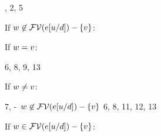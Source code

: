 \begin{bycase}
\Case{$\absO$}
\begin{derivation}
\step{\varI\in\efvar{\absO}}{\hyp}
\step{\esbsokO{\absO}}{\hyp}
\step{\efvar{\esbsO{\expr}}=(\efvar{\expr}-\setI{\varI})\cup\efvar{\exprI}}
     {, 2, 5}
\end{derivation}
If $w\not\in\mathcal{FV}(e[u/d])-\{v\}$:
\begin{derivatioN}{7}
\steP{\cvarv{\abs{\var}{\typ}{\esbsO{\expr}}}{\varII}=\emptyset}
\end{derivatioN}
If $w=v$:
\begin{derivatioN}{8}
\steP{\cvarv{\absO}{\varII}=\emptyset}
\stepL
{\cvarv{\esbsO{(\absO)}}{\varII}
 \linK{=}
 \cond{\varII\neq\varI}{\cvarv{\absO}{\varII}}{\emptyset}
  \cup
   \cond{\varII\in\efvar{\exprI}}
        {\cvarv{\absO}{\varI}\cup\cvarv{\exprI}{\varII}}
        {\emptyset}}
{6, 8, 9, 13}
\end{derivatioN}
If $w\neq v$:
\begin{derivatioN}{8}
\step{\varII\not\in(\efvar{\expr}-\setI{\varI})\cup\efvar{\exprI}}
     {7, \hyp\ $w\not\in\mathcal{FV}(e[u/d])-\{v\}$}
\steP{\varII\not\in\efvar{\expr}\IMPLIES\cvarv{\absO}{\varII}=\emptyset}
\stepL
{\cvarv{\esbsO{(\absO)}}{\varII}
 \linK{=}
 \cond{\varII\neq\varI}{\cvarv{\absO}{\varII}}{\emptyset}
  \cup
   \cond{\varII\in\efvar{\exprI}}
        {\cvarv{\absO}{\varI}\cup\cvarv{\exprI}{\varII}}
        {\emptyset}}
{6, 8, 11, 12, 13}
\end{derivatioN}
If $w\in\mathcal{FV}(e[u/d])-\{v\}$:
\begin{derivatioN}{7}
\steP
{\cvarv{\abs{\var}{\typ}{\esbsO{\expr}}}{\varII}
 \linK{=}
 \setI{\var}\cup\cvarv{\esbsO{\expr}}{\varII}
 \setI{\var}
  \cup
   \cond{\varII\neq\varI}{\cvarv{\expr}{\varII}}{\emptyset}
    \cup
     \cond{\varII\in\efvar{\exprI}}
          {\cvarv{\expr}{\varI}\cup\cvarv{\exprI}{\varII}}
          {\emptyset}
}
\step{\varII\in\efvar{\esbsO{\expr}}\AND\varII\neq\var}

\end{derivatioN}
\end{bycase}
